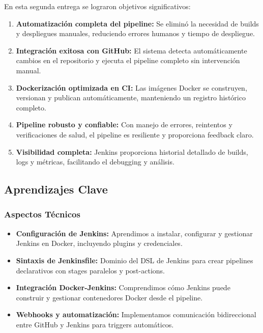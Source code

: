 \documentclass[12pt,a4paper]{article}
\begin{document}
En esta segunda entrega se lograron objetivos significativos:

\begin{enumerate}
    \item \textbf{Automatización completa del pipeline:} Se eliminó la necesidad de builds y despliegues manuales, reduciendo errores humanos y tiempo de despliegue.
    
    \item \textbf{Integración exitosa con GitHub:} El sistema detecta automáticamente cambios en el repositorio y ejecuta el pipeline completo sin intervención manual.
    
    \item \textbf{Dockerización optimizada en CI:} Las imágenes Docker se construyen, versionan y publican automáticamente, manteniendo un registro histórico completo.
    
    \item \textbf{Pipeline robusto y confiable:} Con manejo de errores, reintentos y verificaciones de salud, el pipeline es resiliente y proporciona feedback claro.
    
    \item \textbf{Visibilidad completa:} Jenkins proporciona historial detallado de builds, logs y métricas, facilitando el debugging y análisis.
\end{enumerate}

\subsection{Aprendizajes Clave}

\subsubsection{Aspectos Técnicos}

\begin{itemize}
    \item \textbf{Configuración de Jenkins:} Aprendimos a instalar, configurar y gestionar Jenkins en Docker, incluyendo plugins y credenciales.
    
    \item \textbf{Sintaxis de Jenkinsfile:} Dominio del DSL de Jenkins para crear pipelines declarativos con stages paralelos y post-actions.
    
    \item \textbf{Integración Docker-Jenkins:} Comprendimos cómo Jenkins puede construir y gestionar contenedores Docker desde el pipeline.
    
    \item \textbf{Webhooks y automatización:} Implementamos comunicación bidireccional entre GitHub y Jenkins para triggers automáticos.
\end{itemize}
\end{document}
